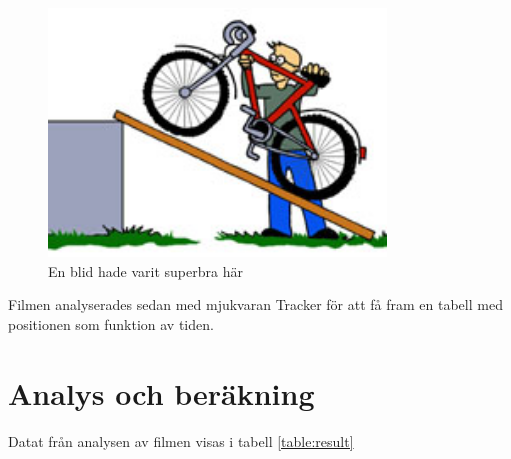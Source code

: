 \documentclass[11p, titlepage, oneside, a4paper]{article}
\begin{document}
        \begin{figure}[!h]
            \includegraphics[width=0.8\textwidth]{images/lutandePlan.jpg}
            \caption{En blid hade varit superbra här}
            \label{fig:lutandeplan}
        \end{figure}
        
        Filmen analyserades sedan med mjukvaran Tracker för att få fram en tabell med positionen som funktion av tiden.
    \newpage
	\section{Analys och beräkning}
        Datat från analysen av filmen visas i tabell \ref{table:result}
\end{document}
